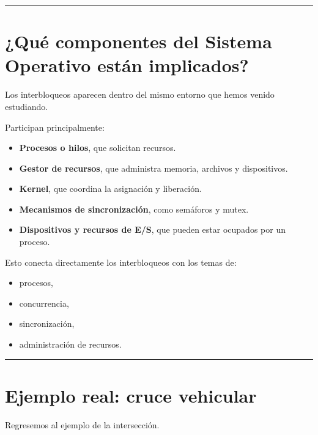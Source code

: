 \documentclass[
  spanish,
  letterpaper,
]{scrbook}
\providecommand{\tightlist}{%
  \setlength{\itemsep}{0pt}\setlength{\parskip}{0pt}}
\begin{document}
\begin{center}\rule{0.5\linewidth}{0.5pt}\end{center}


\chapter{¿Qué componentes del Sistema Operativo están
implicados?}\label{quuxe9-componentes-del-sistema-operativo-estuxe1n-implicados}

Los interbloqueos aparecen dentro del mismo entorno que hemos venido
estudiando.

Participan principalmente:

\begin{itemize}
\tightlist
\item
  \textbf{Procesos o hilos}, que solicitan recursos.
\item
  \textbf{Gestor de recursos}, que administra memoria, archivos y
  dispositivos.
\item
  \textbf{Kernel}, que coordina la asignación y liberación.
\item
  \textbf{Mecanismos de sincronización}, como semáforos y mutex.
\item
  \textbf{Dispositivos y recursos de E/S}, que pueden estar ocupados por
  un proceso.
\end{itemize}

Esto conecta directamente los interbloqueos con los temas de:

\begin{itemize}
\tightlist
\item
  procesos,
\item
  concurrencia,
\item
  sincronización,
\item
  administración de recursos.
\end{itemize}

\begin{center}\rule{0.5\linewidth}{0.5pt}\end{center}


\chapter{Ejemplo real: cruce
vehicular}\label{ejemplo-real-cruce-vehicular}

Regresemos al ejemplo de la intersección.
\end{document}
